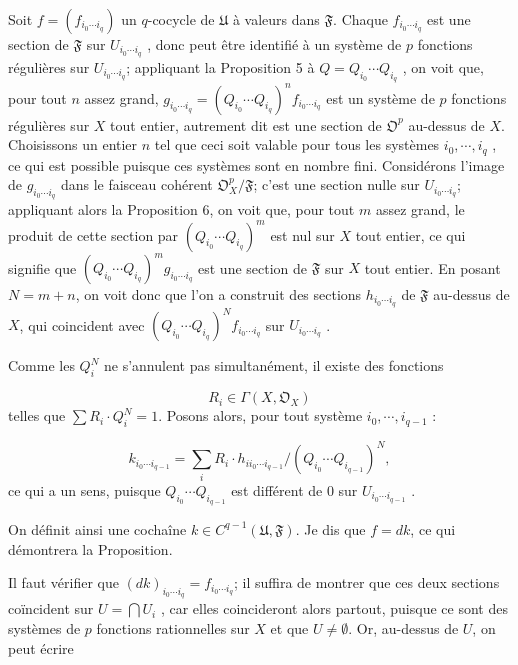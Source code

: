 Soit $f = (f_{i_0 \cdots i_q})$ un $q$-cocycle de $\mathfrak{U}$ à valeurs dans $\mathfrak{F}$. Chaque $f_{i_0 \cdots i_q}$ est une section de $\mathfrak{F}$ sur $U_{i_0 \cdots i_q}$ , donc peut être identifié à un système de $p$ fonctions régulières sur $U_{i_0 \cdots i_q}$; appliquant la Proposition 5 à $Q = Q_{i_0} \cdots Q_{i_q}$ , on voit que, pour tout $n$ assez grand, $g_{i_0 \cdots i_q} = (Q_{i_0} \cdots Q_{i_q})^n f_{i_0 \cdots i_q}$ est un système de $p$ fonctions régulières sur $X$ tout entier, autrement dit est une section de $\mathfrak{O}^p$ au-dessus de $X$. Choisissons un entier $n$ tel que ceci soit valable pour tous les systèmes $i_0 , \cdots , i_q$ , ce qui est possible puisque ces systèmes sont en nombre fini. Considérons l'image de $g_{i_0 \cdots i_q}$ dans le faisceau cohérent $\mathfrak{O}^p_X/\mathfrak{F}$; c'est une section nulle sur $U_{i_0 \cdots i_q}$; appliquant alors la Proposition 6, on voit que, pour tout $m$ assez grand, le produit de cette section par $(Q_{i_0} \cdots Q_{i_q})^m$ est nul sur $X$ tout entier, ce qui signifie que $(Q_{i_0} \cdots Q_{i_q})^m g_{i_0 \cdots i_q}$ est une section de $\mathfrak{F}$ sur $X$ tout entier. En posant $N = m + n$, on voit donc que l'on a construit des sections $h_{i_0 \cdots i_q}$ de $\mathfrak{F}$ au-dessus de $X$, qui coincident avec $(Q_{i_0} \cdots Q_{i_q})^N f_{i_0 \cdots i_q}$ sur $U_{i_0 \cdots i_q}$ .

Comme les $Q_i^N$ ne s'annulent pas simultanément, il existe des fonctions

\begin{equation*}
R_i \in \Gamma(X, \mathfrak{O}_X)
\end{equation*}
telles que $\sum R_i \cdot Q_i^N = 1$. Posons alors, pour tout système $i_0 , \cdots , i_{q-1}$ :

\begin{equation*}
k_{i_0 \cdots i_{q-1}} = \sum_i R_i \cdot h_{i i_0 \cdots i_{q-1}}/(Q_{i_0} \cdots Q_{i_{q-1}})^N,
\end{equation*}
ce qui a un sens, puisque $Q_{i_0} \cdots Q_{i_{q-1}}$ est différent de 0 sur $U_{i_0 \cdots i_{q-1}}$ .

On définit ainsi une cochaîne $k \in C^{q-1}(\mathfrak{U}, \mathfrak{F})$. Je dis que $f = dk$, ce qui démontrera la Proposition.

Il faut vérifier que $(dk)_{i_0 \cdots i_q} = f_{i_0 \cdots i_q}$; il suffira de montrer que ces deux sections coïncident sur $U = \bigcap U_i$ , car elles coincideront alors partout, puisque ce sont des systèmes de $p$ fonctions rationnelles sur $X$ et que $U \neq \emptyset$. Or, au-dessus de $U$, on peut écrire

